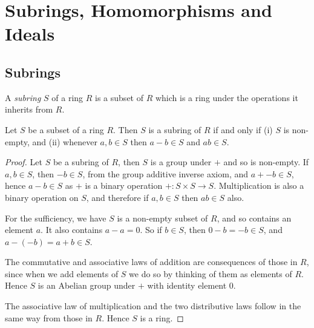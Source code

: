 \section{Subrings, Homomorphisms and Ideals}

\subsection{Subrings}

\begin{Def}
A \emph{subring} $S$ of a ring $R$ is a subset of $R$
which is a ring under the operations it inherits from $R$.
\end{Def}

\begin{Lemma}
Let $S$ be a subset of a ring $R$. Then $S$ is a subring
of $R$ if and only if (i) $S$ is non-empty, and (ii) whenever
$a, b \in S$ then $a - b \in S$ and $ab \in S$.
\end{Lemma}

\begin{proof}
Let $S$ be a subring of $R$, then $S$ is a group under $+$
and so is non-empty. If $a, b \in S$, then $-b \in S$, from
the group additive inverse axiom, and $a + -b \in S$, hence
$a - b \in S$ as $+$ is a binary operation $+: S \times S \to S$.
Multiplication is also a binary operation on $S$, and therefore
if $a, b \in S$ then $ab \in S$ also.

For the sufficiency, we have $S$ is a non-empty subset of $R$,
and so contains an element $a$. It also contains $a - a = 0$.
So if $b \in S$, then $0 - b = -b \in S$, and $a - (-b) = a + b
\in S$.

The commutative and associative laws of addition are consequences
of those in $R$, since when we add elements of $S$ we do so by
thinking of them as elements of $R$. Hence $S$ is an Abelian
group under $+$ with identity element $0$.

The associative law of multiplication and the two distributive
laws follow in the same way from those in $R$. Hence $S$ is a ring.
\end{proof}

